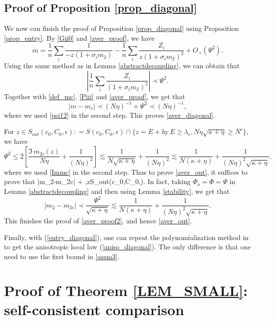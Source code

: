\subsection{Proof of Proposition \ref{prop_diagonal}}

We now can finish the proof of Proposition \ref{prop_diagonal} using Proposition \ref{prop_entry}. By \eqref{Gii0} and \eqref{aver_proof}, we have
$$m=\frac1n\sum_i \frac{1}{-z(1 + \sigma_i m_2)} - \frac1n\sum_i \frac{Z_i}{z\left(1 +  \sigma_i m_2\right)^2}  +O_\prec\left(\Psi^2\right).$$
Using the same method as in Lemma \ref{abstractdecoupling}, we can obtain that
$$\left|\frac1n\sum_i \frac{Z_i}{\left(1 +  \sigma_i m_2\right)^2}\right| \prec \Psi^2.$$
Together with \eqref{def_mc}, \eqref{Piii} and \eqref{aver_proof}, we get that
$$|m-m_c| \prec (N\eta)^{-1} + \Psi^2 \prec (N\eta)^{-1},$$
where we used \eqref{psi12} in the second step. This proves \eqref{aver_diagonal}. 

For $z\in S_{out}(c_0,C_0,\epsilon): =S(c_0,C_0,\epsilon)\cap \{z=E+\ii\eta: E\ge \lambda_r, N\eta\sqrt{\kappa + \eta} \ge N^\epsilon\}$, we have
$$\Psi^2 \le 2\left[{\frac{\Im \, m_{2c}(z)}{{N\eta }} } + \frac{1}{(N\eta)^2}\right] \lesssim \frac{1}{N\sqrt{\kappa+\eta}} + \frac{1}{(N\eta)^2} \lesssim \frac{1}{N(\kappa +\eta)} + \frac{1}{(N\eta)^2\sqrt{\kappa +\eta}},$$
where we used \eqref{Immc} in the second step. Thus to prove \eqref{aver_out}, it suffices to prove that 
\be\label{aver_proof2}
|m_2-m_{2c}|\prec {} +  ,\quad z\in S_{out}(c_0,C_0,\epsilon).
\ee
In fact, taking $\Phi_o=\Phi=\Psi$ in Lemma \ref{abstractdecoupling} and then using Lemma \ref{stability}, we get that
$$|m_2-m_{2c}|\prec \frac{\Psi^2}{\sqrt{\kappa + \eta}} \lesssim \frac{1}{N(\kappa +\eta)} + \frac{1}{(N\eta)^2\sqrt{\kappa +\eta}}.$$
This finishes the proof of \eqref{aver_proof2}, and hence \eqref{aver_out}.

Finally, with (\ref{entry_diagonal}), one can repeat the polynomialization method in \cite[Section 5]{isotropic} to get the anisotropic local law (\ref{aniso_diagonal}). The only difference is that one need to use the first bound in \eqref{assm3}.

\section{Proof of Theorem \ref{LEM_SMALL}: self-consistent comparison}\label{sec_comparison}

